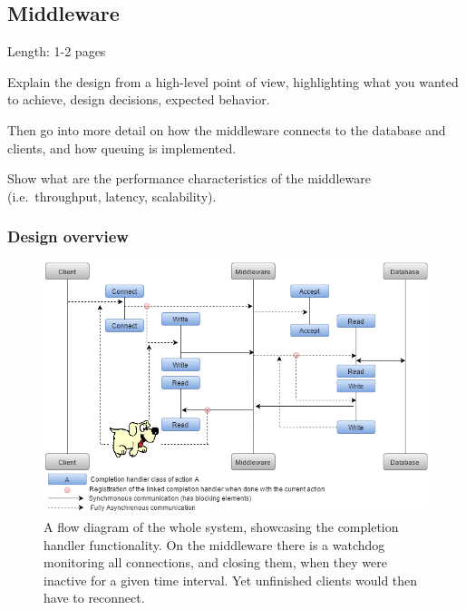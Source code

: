 \documentclass[11pt]{article}
\begin{document}
\subsection{Middleware}\label{sec:middleware}

Length: 1-2 pages

Explain the design from a high-level point of view, highlighting what
you wanted to achieve, design decisions, expected behavior.

Then go into more detail on how the middleware connects to the database
and clients, and how queuing is implemented.

Show what are the performance characteristics of the middleware
(i.e.~throughput, latency, scalability).

\subsubsection{Design overview}\label{sec:design-overview}
\begin{figure}[!htb]
\centering
\includegraphics[width=1.0\linewidth]{figures/middleware/mw_design}
\caption{A flow diagram of the whole system, showcasing the completion handler functionality. On the middleware there is a watchdog monitoring all connections, and closing them, when they were inactive for a given time interval. Yet unfinished clients would then have to reconnect.}
\label{fig:mw_design}
\end{figure}
\end{document}
